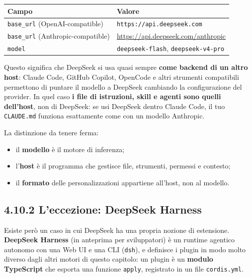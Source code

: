 \documentclass[
  italian,
  10pt,
]{book}
\newcounter{none} %
\providecommand{\tightlist}{%
  \setlength{\itemsep}{0pt}\setlength{\parskip}{0pt}}
\begin{document}
{\def\LTcaptype{none} %
\begin{longtable}[]{@{}
  >{\raggedright\arraybackslash}p{}
  >{\raggedright\arraybackslash}p{}@{}}
\toprule\noalign{}
\begin{minipage}[b]{\linewidth}\raggedright
Campo
\end{minipage} & \begin{minipage}[b]{\linewidth}\raggedright
Valore
\end{minipage} \\
\midrule\noalign{}
\endhead
\bottomrule\noalign{}
\endlastfoot
\texttt{base\_url} (OpenAI-compatible) &
\texttt{https://api.deepseek.com} \\
\texttt{base\_url} (Anthropic-compatible) &
\url{https://api.deepseek.com/anthropic} \\
\texttt{model} & \texttt{deepseek-flash}, \texttt{deepseek-v4-pro} \\
\end{longtable}
}

Questo significa che DeepSeek si usa quasi sempre \textbf{come backend
di un altro host}: Claude Code, GitHub Copilot, OpenCode e altri
strumenti compatibili permettono di puntare il modello a DeepSeek
cambiando la configurazione del provider. In quel caso \textbf{i file di
istruzioni, skill e agenti sono quelli dell'host}, non di DeepSeek: se
usi DeepSeek dentro Claude Code, il tuo \texttt{CLAUDE.md} funziona
esattamente come con un modello Anthropic.

La distinzione da tenere ferma:

\begin{itemize}
\tightlist
\item
  il \textbf{modello} è il motore di inferenza;
\item
  l'\textbf{host} è il programma che gestisce file, strumenti, permessi
  e contesto;
\item
  il \textbf{formato} delle personalizzazioni appartiene all'host, non
  al modello.
\end{itemize}

\subsection{4.10.2 L'eccezione: DeepSeek
Harness}\label{leccezione-deepseek-harness}

Esiste però un caso in cui DeepSeek ha una propria nozione di
estensione. \textbf{DeepSeek Harness} (in anteprima per sviluppatori) è
un runtime agentico autonomo con una Web UI e una CLI (\texttt{dsh}), e
definisce i plugin in modo molto diverso dagli altri motori di questo
capitolo: un plugin è un \textbf{modulo TypeScript} che esporta una
funzione \texttt{apply}, registrato in un file \texttt{cordis.yml}.
\end{document}
